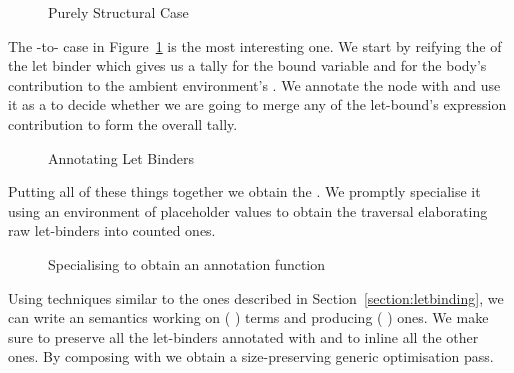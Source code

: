 \begin{figure}[h]
  \caption{Purely Structural Case}
\end{figure}

The -to- case in Figure~\ref{fig:lettoclet} is the most
interesting one. We start by reifying the  of the let binder which
gives us a tally  for the bound variable and  for the body's
contribution to the ambient environment's . We annotate the node
with  and use it as a  to decide whether we are going to
merge any of the let-bound's expression contribution  to form the
overall tally.

\begin{figure}[h]
  \caption{Annotating Let Binders}\label{fig:lettoclet}
\end{figure}

Putting all of these things together we obtain the  .
We promptly specialise it using an environment of placeholder values to obtain
the traversal  elaborating raw let-binders into counted ones.

\begin{figure}[h]
\caption{Specialising  to obtain an annotation function}
\end{figure}

Using techniques similar to the ones described in Section~\ref{section:letbinding},
we can write an  semantics working on {(  )} terms
and producing {(  )} ones. We make sure to preserve all the
let-binders annotated with  and to inline all the other ones. By composing
 with  we obtain a size-preserving generic optimisation pass.
